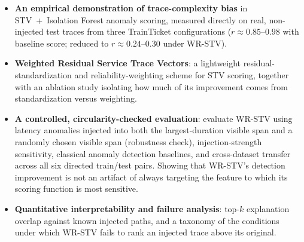 \begin{itemize}
    \item \textbf{An empirical demonstration of trace-complexity bias} in
    STV~+~Isolation Forest anomaly scoring, measured directly on real,
    non-injected test traces from three TrainTicket configurations
    ($r \approx 0.85$--$0.98$ with baseline score; reduced to
    $r \approx 0.24$--$0.30$ under WR-STV).

    \item \textbf{Weighted Residual Service Trace Vectors}: a lightweight residual-standardization and
    reliability-weighting scheme for STV scoring, together with an ablation
 study isolating how much of its improvement comes from standardization versus
    weighting.

    \item \textbf{A controlled, circularity-checked evaluation}: evaluate WR-STV using latency
    anomalies injected into both the largest-duration visible span and a randomly chosen visible span (robustness check), injection-strength sensitivity, classical  anomaly detection baselines, and cross-dataset transfer across all six directed train/test pairs. Showing that WR-STV's detection improvement is not an artifact of always targeting the feature to which its scoring function is most sensitive.

   
    \item \textbf{Quantitative interpretability and failure analysis}:
    top-$k$ explanation overlap against known injected paths, and a
    taxonomy of the conditions under which WR-STV fails to rank an injected
    trace above its original.
\end{itemize}

